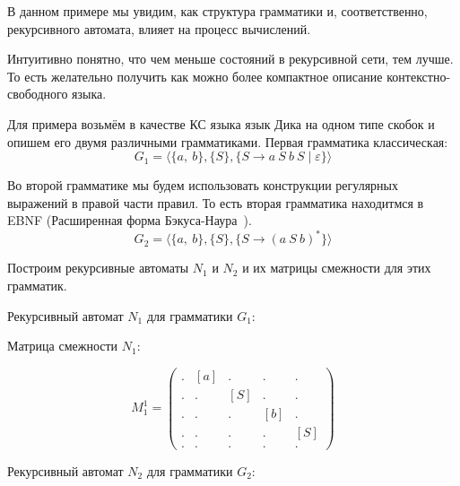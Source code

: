 \begin{example}

В данном примере мы увидим, как структура грамматики и, соответственно, рекурсивного автомата, влияет на процесс вычислений.

Интуитивно понятно, что чем меньше состояний в рекурсивной сети, тем лучше.
То есть желательно получить как можно более компактное описание контекстно-свободного языка.

Для примера возьмём в качестве КС языка язык Дика на одном типе скобок и опишем его двумя различными грамматиками.
Первая грамматика классическая:
$$
G_1 = \langle \{a,\ b\}, \{ S \}, \{S \to a \ S \ b \ S \mid \varepsilon  \} \rangle
$$

Во второй грамматике мы будем использовать конструкции регулярных выражений в правой части правил.
То есть вторая грамматика находитмся в EBNF (Расширенная форма Бэкуса-Наура~\cite{Hemerik2009, Wirth1977}).
$$
G_2 = \langle \{a, \ b\}, \{S\}, \{S \to (a \ S \ b)^{*}\} \rangle
$$

Построим рекурсивные автоматы $N_1$ и $N_2$ и их матрицы смежности для этих грамматик.

Рекурсивный автомат $N_1$ для грамматики $G_1$:
\begin{center}
\end{center}

Матрица смежности $N_1$:

$$
M_1^1 =
\begin{pmatrix}
. & [a] & .   & .   & .  \\
. & .   & [S] & .   & .  \\
. & .   & .   & [b] & .  \\
. & .   & .   & .   & [S] \\
. & .   & .   & .   & .
\end{pmatrix}
$$


Рекурсивный автомат $N_2$ для грамматики $G_2$:
\begin{center}
  
\end{center}


\end{example}

